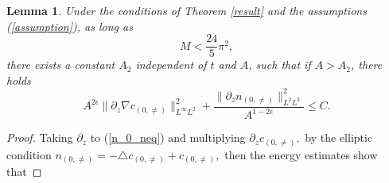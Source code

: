 \documentclass[12pt, reqno]{amsart}
\newtheorem{lemma}{Lemma}[section]
\numberwithin{equation}{section}
\begin{document}
	
	\begin{lemma}\label{lemma_n002}
		Under the conditions of Theorem \ref{result} and the assumptions (\ref{assumption}), 
		as long as $$M< \frac{24}{5}\pi^2,$$
		there exists a constant $A_2$ independent of $t$ and $A$, such that if $A>A_2$, 
		there holds 
		$$
		A^{2\epsilon}\|\partial_z\nabla c_{(0,\neq)}\|^2_{L^{\infty}L^2}+
		\frac{\|\partial_zn_{(0,\neq)}\|^2_{L^2L^2}}{A^{1-2\epsilon}}\leq C.$$
	\end{lemma}
	\begin{proof}
		
		Taking $\partial_z$ to (\ref{n_0_neq}) and multiplying $\partial_zc_{(0,\neq)},$
		by the elliptic condition $n_{(0,\neq)}=-\triangle c_{(0,\neq)}+c_{(0,\neq)},$
		then the energy estimates show that 

\end{proof}
\end{document}
